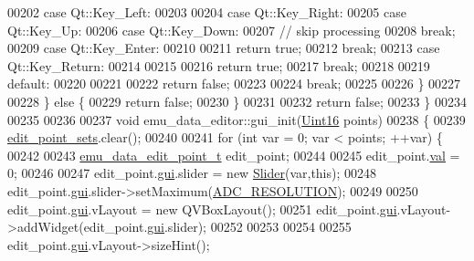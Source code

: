 \begin{DoxyCode}
00202             \textcolor{keywordflow}{case} Qt::Key\_Left:
00203 
00204             \textcolor{keywordflow}{case} Qt::Key\_Right:
00205             \textcolor{keywordflow}{case} Qt::Key\_Up:
00206             \textcolor{keywordflow}{case} Qt::Key\_Down:
00207                 \textcolor{comment}{// skip processing}
00208                 \textcolor{keywordflow}{break};
00209             \textcolor{keywordflow}{case} Qt::Key\_Enter:
00210 
00211                  \textcolor{keywordflow}{return} \textcolor{keyword}{true};
00212                 \textcolor{keywordflow}{break};
00213             \textcolor{keywordflow}{case} Qt::Key\_Return:
00214 
00215 
00216                  \textcolor{keywordflow}{return} \textcolor{keyword}{true};
00217                 \textcolor{keywordflow}{break};
00218 
00219             \textcolor{keywordflow}{default}:
00220 
00221 
00222                 \textcolor{keywordflow}{return} \textcolor{keyword}{false};
00223 
00224                \textcolor{keywordflow}{break};
00225 
00226             \}
00227 
00228         \} \textcolor{keywordflow}{else} \{
00229             \textcolor{keywordflow}{return} \textcolor{keyword}{false};
00230         \}
00231 
00232         \textcolor{keywordflow}{return} \textcolor{keyword}{false};
00233 \}
00234 
00235 
00236 
00237 \textcolor{keywordtype}{void} emu\_data\_editor::gui\_init(\hyperlink{a00004_aae7407b021d43f7193a81a58cfb3e297}{Uint16} points)
00238 \{
00239           \hyperlink{a00008_ab093b86d07b4eb96c36878089a7d97df}{edit\_point\_sets}.clear();
00240 
00241           \textcolor{keywordflow}{for} (\textcolor{keywordtype}{int} var = 0; var < points; ++var) \{
00242 
00243            \hyperlink{a00004_d1/db7/a00157}{emu\_data\_edit\_point\_t} edit\_point;
00244 
00245            edit\_point.\hyperlink{a00004_aaf35f240371007fbceb3387f76ad53a7}{val} = 0;
00246 
00247            edit\_point.\hyperlink{a00004_ad927f72d9047284b972a0aaa5aa94b93}{gui}.slider  = \textcolor{keyword}{new} \hyperlink{a00077}{Slider}(var,\textcolor{keyword}{this});
00248            edit\_point.\hyperlink{a00004_ad927f72d9047284b972a0aaa5aa94b93}{gui}.slider->setMaximum(\hyperlink{a00086_a00978ca9e8220475258dcbbbb7d29129}{ADC\_RESOLUTION});
00249 
00250            edit\_point.\hyperlink{a00004_ad927f72d9047284b972a0aaa5aa94b93}{gui}.vLayout = \textcolor{keyword}{new} QVBoxLayout();
00251            edit\_point.\hyperlink{a00004_ad927f72d9047284b972a0aaa5aa94b93}{gui}.vLayout->addWidget(edit\_point.\hyperlink{a00004_ad927f72d9047284b972a0aaa5aa94b93}{gui}.slider);
00252 
00253 
00254 
00255            edit\_point.\hyperlink{a00004_ad927f72d9047284b972a0aaa5aa94b93}{gui}.vLayout->sizeHint();

\end{DoxyCode}
